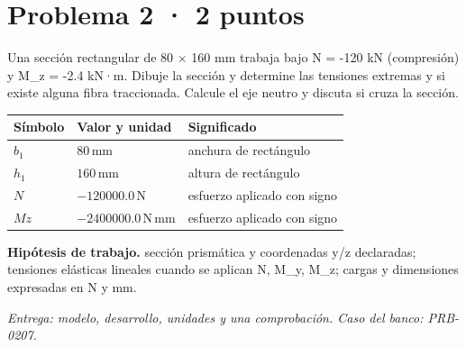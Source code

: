 \par\medskip\noindent\begin{minipage}{\linewidth}

\section{Problema 2 · 2 puntos}

Una sección rectangular de 80 \ensuremath{\times} 160 mm trabaja bajo N = -120 kN (compresión) y M\_z = -2.4 kN·m. Dibuje la sección y determine las tensiones extremas y si existe alguna fibra traccionada. Calcule el eje neutro y discuta si cruza la sección.

\par\medskip\noindent\begin{tabular}{@{}p{.18\linewidth}p{.26\linewidth}p{.48\linewidth}@{}}
\toprule Símbolo & Valor y unidad & Significado\\\midrule
$b_{1}$ & $80\,\mathrm{mm}$ & anchura de rectángulo\\
$h_{1}$ & $160\,\mathrm{mm}$ & altura de rectángulo\\
$N$ & $-120000.0\,\mathrm{N}$ & esfuerzo aplicado con signo\\
$Mz$ & $-2400000.0\,\mathrm{N\,mm}$ & esfuerzo aplicado con signo\\
\bottomrule\end{tabular}\par\medskip



\par\textbf{Hipótesis de trabajo.} sección prismática y coordenadas y/z declaradas; tensiones elásticas lineales cuando se aplican N, M\_y, M\_z; cargas y dimensiones expresadas en N y mm.

\par\textit{Entrega: modelo, desarrollo, unidades y una comprobación. Caso del banco: PRB-0207.}\end{minipage}\par\medskip

